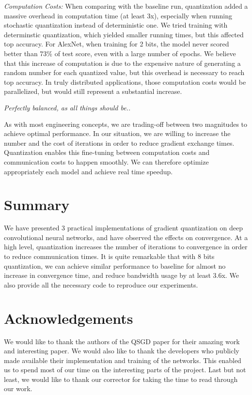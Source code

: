 \documentclass[10pt,conference,compsocconf]{IEEEtran}
\begin{document}
\textit{Computation Costs:} When comparing with the baseline run, quantization added a massive overhead in computation time (at least 3x), especially when running stochastic quantization instead of deterministic one. We tried training with determinstic quantization, which yielded smaller running times, but this affected top accuracy. For AlexNet, when training for 2 bits, the model never scored better than 73\% of test score, even with a large number of epochs. We believe that this increase of computation is due to the expensive nature of generating a random number for each quantized value, but this overhead is necessary to reach top accuracy. In truly distributed applications, those computation costs would be parallelized, but would still represent a substantial increase.


\begin{center}
\textit{Perfectly balanced, as all things should be..}
\end{center}

As with most engineering concepts, we are trading-off between two magnitudes to achieve optimal performance. In our situation, we are willing to increase the number and the cost of iterations in order to reduce gradient exchange times. Quantization enables this fine-tuning between computation costs and communication costs to happen smoothly. We can therefore optimize appropriately each model and achieve real time speedup.


\section{Summary}

We have presented 3 practical implementations of gradient quantization on deep convolutional neural networks, and have observed the effects on convergence. At a high level, quantization increases the number of iterations to convergence in order to reduce communication times. It is quite remarkable that with 8 bits quantization, we can achieve similar performance to baseline for almost no increase in convergence time, and reduce bandwidth usage by at least 3.6x. We also provide all the necessary code to reproduce our experiments.

\section*{Acknowledgements}

We would like to thank the authors of the QSGD paper for their amazing work and interesting paper. We would also like to thank the developers who publicly made available their implementation and training of the networks. This enabled us to spend most of our time on the interesting parts of the project. Last but not least, we would like to thank our corrector for taking the time to read through our work.


\newpage


\end{document}
